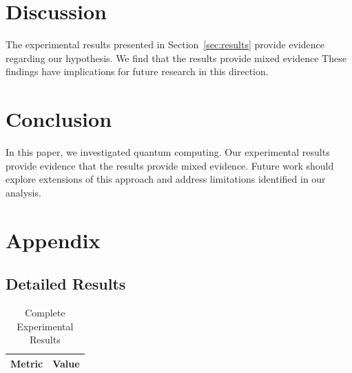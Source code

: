 \documentclass{article}
\begin{document}
\section{Discussion}

The experimental results presented in Section~\ref{sec:results} provide evidence regarding our hypothesis. We find that the results provide mixed evidence These findings have implications for future research in this direction.

\section{Conclusion}

In this paper, we investigated quantum computing. Our experimental results provide evidence that the results provide mixed evidence. Future work should explore extensions of this approach and address limitations identified in our analysis.

\appendix

\section{Appendix}

\subsection{Detailed Results}

\begin{table}[htbp]
\centering
\caption{Complete Experimental Results}
\begin{tabular}{lc}
\toprule
Metric & Value \\
\midrule
\bottomrule
\end{tabular}
\end{table}




\end{document}
